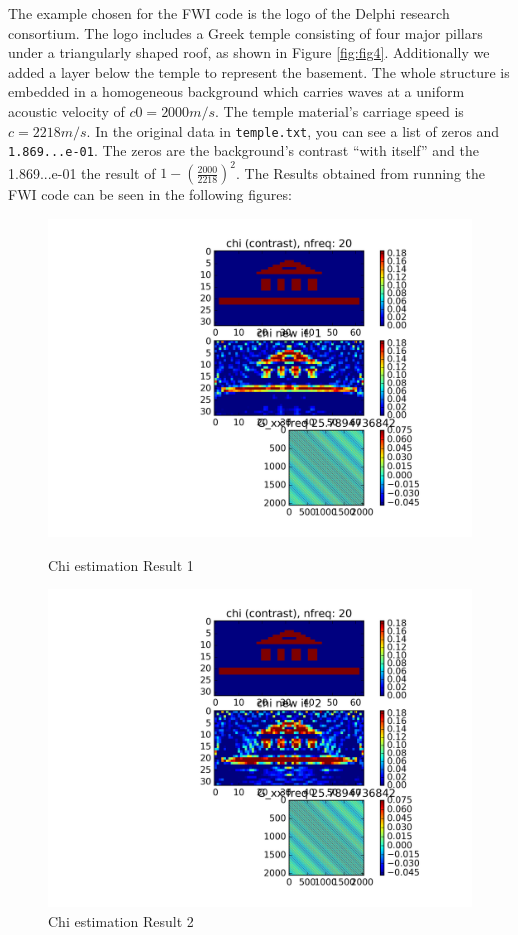 \documentclass[10pt,a4paper]{article}
\begin{document}
The example chosen for the FWI code is the logo of the Delphi
research consortium. The logo includes a
Greek temple consisting of four major
pillars under a triangularly shaped roof, as shown in Figure \ref{fig:fig4}.
Additionally we added a layer below the temple to represent the
basement. The whole structure is embedded in a homogeneous background
which carries waves at a
uniform acoustic velocity of
$c0 = 2000 m/s$.
The temple material's carriage speed is $c = 2218 m/s$.
In the original data in \texttt{temple.txt}, you can see a list of
zeros and \texttt{1.869...e-01}. The zeros are the background's
contrast ``with itself'' and the 1.869...e-01 the result of $1-
{(\frac{2000}{2218})}^2$.
The Results obtained from running the FWI code can be seen in the
following figures:
\begin{figure}
\centering
 \includegraphics[scale=0.75]{Chi_est_it00.png}
  \caption{Chi estimation Result 1}
  \label{fig:fig4}
 \includegraphics[scale=0.75]{Chi_est_it01.png}
  \caption{Chi estimation Result 2}
  \label{fig:fig5}
\end{figure}
\end{document}
